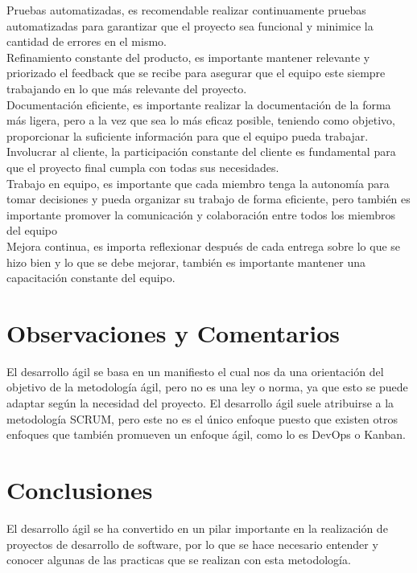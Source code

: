 \documentclass[12pt]{article}
\begin{document}
Pruebas automatizadas, es recomendable realizar continuamente pruebas automatizadas para garantizar que el proyecto sea funcional y minimice la cantidad de errores en el mismo.\\ 

Refinamiento constante del producto, es importante mantener relevante y priorizado el feedback que se recibe para asegurar que el equipo este siempre trabajando en lo que más relevante del proyecto.\\ 

Documentación eficiente, es importante realizar la documentación de la forma más ligera, pero a la vez que sea lo más eficaz posible, teniendo como objetivo, proporcionar la suficiente información para que el equipo pueda trabajar.\\ 

Involucrar al cliente, la participación constante del cliente es fundamental para que el proyecto final cumpla con todas sus necesidades.\\ 

Trabajo en equipo, es importante que cada miembro tenga la autonomía para tomar decisiones y pueda organizar su trabajo de forma eficiente, pero también es importante promover la comunicación y colaboración entre todos los miembros del equipo\\ 

Mejora continua, es importa reflexionar después de cada entrega sobre lo que se hizo bien y lo que se debe mejorar, también es importante mantener una capacitación constante del equipo.


\section*{Observaciones y Comentarios}
El desarrollo ágil se basa en un manifiesto el cual nos da una orientación del objetivo de la metodología ágil, pero no es una ley o norma, ya que esto se puede adaptar según la necesidad del proyecto. El desarrollo ágil suele atribuirse a la metodología SCRUM, pero este no es el único enfoque puesto que existen otros enfoques que también promueven un enfoque ágil, como lo es DevOps o Kanban.


\section*{Conclusiones}
El desarrollo ágil se ha convertido en un pilar importante en la realización de proyectos de desarrollo de software, por lo que se hace necesario entender y conocer algunas de las practicas que se realizan con esta metodología.
\end{document}

